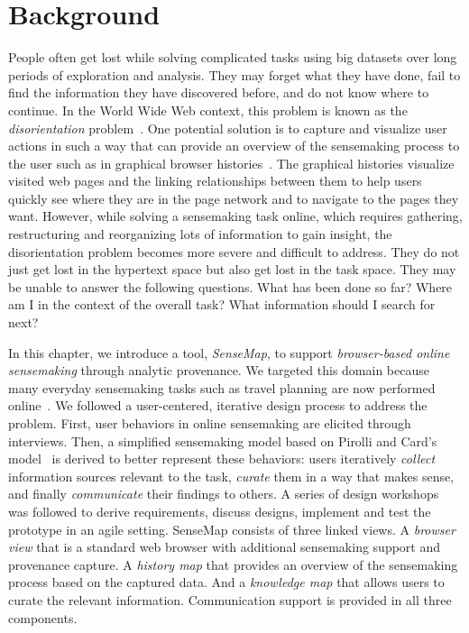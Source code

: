 \section{Background}
People often get lost while solving complicated tasks using big datasets over long periods of exploration and analysis. They may forget what they have done, fail to find the information they have discovered before, and do not know where to continue. In the World Wide Web context, this problem is known as the \textit{disorientation} problem~\cite{Conklin1987}. One potential solution is to capture and visualize user actions in such a way that can provide an overview of the sensemaking process to the user such as in graphical browser histories~\cite{Ayers1995,Hightower1998,Milic-Frayling2003}. The graphical histories visualize visited web pages and the linking relationships between them to help users quickly see where they are in the page network and to navigate to the pages they want. However, while solving a sensemaking task online, which requires gathering, restructuring and reorganizing lots of information to gain insight, the disorientation problem becomes more severe and difficult to address. They do not just get lost in the hypertext space but also get lost in the task space. They may be unable to answer the following questions. What has been done so far? Where am I in the context of the overall task? What information should I search for next?

In this chapter, we introduce a tool, \emph{SenseMap}, to support \textit{browser-based online sensemaking} through analytic provenance. We targeted this domain because many everyday sensemaking tasks such as travel planning are now performed online~\cite{Russell2008}.
We followed a user-centered, iterative design process to address the problem. First, user behaviors in online sensemaking are elicited through interviews. Then, a simplified sensemaking model based on Pirolli and Card's model~\cite{Pirolli2005} is derived to better represent these behaviors: users iteratively \textit{collect} information sources relevant to the task, \textit{curate} them in a way that makes sense, and finally \textit{communicate} their findings to others. A series of design workshops was followed to derive requirements, discuss designs, implement and test the prototype in an agile setting. SenseMap consists of three linked views. A \emph{browser view} that is a standard web browser with additional sensemaking support and provenance capture. A \emph{history map} that provides an overview of the sensemaking process based on the captured data. And a \emph{knowledge map} that allows users to curate the relevant information. Communication support is provided in all three components.


